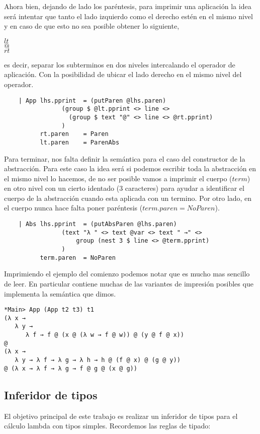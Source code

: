 \documentclass[a4paper,10pt]{article}
\begin{document}
Ahora bien, dejando de lado los paréntesis, para imprimir una aplicación la idea será
intentar que tanto el lado izquierdo como el derecho estén en el mismo nivel y en caso
de que esto no sea posible obtener lo siguiente,

\begin{center}
$lt$\\
$@$\\
$rt$
\end{center}

es decir, separar los subterminos en dos niveles intercalando el operador de aplicación.
Con la posibilidad de ubicar el lado derecho en el mismo nivel del operador.

\begin{lstlisting}    
    | App lhs.pprint  = (putParen @lhs.paren) 
                (group $ @lt.pprint <> line <> 
                  (group $ text "@" <> line <> @rt.pprint)
                )
          rt.paren    = Paren
          lt.paren    = ParenAbs
\end{lstlisting}    

Para terminar, nos falta definir la semántica para el caso del constructor de la
abstracción. Para este caso la idea será si podemos escribir toda la abstracción
en el mismo nivel lo hacemos, de no ser posible vamos a imprimir el cuerpo ($term$)
en otro nivel con un cierto identado (3 caracteres) para ayudar a identificar el
cuerpo de la abstracción cuando esta aplicada con un termino. Por otro lado, en el
cuerpo nunca hace falta poner paréntesis ($term.paren = NoParen$).

\begin{lstlisting}
    | Abs lhs.pprint  = (putAbsParen @lhs.paren)
                (text "λ " <> text @var <> text " →" <> 
                    group (nest 3 $ line <> @term.pprint)
                )
          term.paren  = NoParen
\end{lstlisting}

Imprimiendo el ejemplo del comienzo podemos notar que es mucho mas sencillo de
leer. En particular contiene muchas de las variantes de impresión posibles que
implementa la semántica que dimos.

\begin{verbatim}
*Main> App (App t2 t3) t1
(λ x →
   λ y →
      λ f → f @ (x @ (λ w → f @ w)) @ (y @ f @ x))
@
(λ x →
   λ y → λ f → λ g → λ h → h @ (f @ x) @ (g @ y))
@ (λ x → λ f → λ g → f @ g @ (x @ g))
\end{verbatim}

\subsection{Inferidor de tipos}
 El objetivo principal de este trabajo es realizar un inferidor de tipos para el cálculo lambda con tipos simples. Recordemos
 las reglas de tipado:
 
\end{document}
